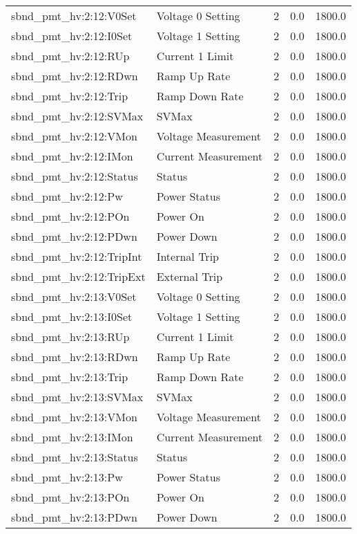 \begin{center}
\begin{longtable}{l | l l l l }
sbnd\_pmt\_hv:2:12:V0Set & Voltage 0 Setting & 2 & 0.0 & 1800.0\\ 
sbnd\_pmt\_hv:2:12:I0Set & Voltage 1 Setting & 2 & 0.0 & 1800.0\\ 
sbnd\_pmt\_hv:2:12:RUp & Current 1 Limit & 2 & 0.0 & 1800.0\\ 
sbnd\_pmt\_hv:2:12:RDwn & Ramp Up Rate & 2 & 0.0 & 1800.0\\ 
sbnd\_pmt\_hv:2:12:Trip & Ramp Down Rate & 2 & 0.0 & 1800.0\\ 
sbnd\_pmt\_hv:2:12:SVMax & SVMax & 2 & 0.0 & 1800.0\\ 
sbnd\_pmt\_hv:2:12:VMon & Voltage Measurement & 2 & 0.0 & 1800.0\\ 
sbnd\_pmt\_hv:2:12:IMon & Current Measurement & 2 & 0.0 & 1800.0\\ 
sbnd\_pmt\_hv:2:12:Status & Status & 2 & 0.0 & 1800.0\\ 
sbnd\_pmt\_hv:2:12:Pw & Power Status & 2 & 0.0 & 1800.0\\ 
sbnd\_pmt\_hv:2:12:POn & Power On & 2 & 0.0 & 1800.0\\ 
sbnd\_pmt\_hv:2:12:PDwn & Power Down & 2 & 0.0 & 1800.0\\ 
sbnd\_pmt\_hv:2:12:TripInt & Internal Trip & 2 & 0.0 & 1800.0\\ 
sbnd\_pmt\_hv:2:12:TripExt & External Trip & 2 & 0.0 & 1800.0\\ 
sbnd\_pmt\_hv:2:13:V0Set & Voltage 0 Setting & 2 & 0.0 & 1800.0\\ 
sbnd\_pmt\_hv:2:13:I0Set & Voltage 1 Setting & 2 & 0.0 & 1800.0\\ 
sbnd\_pmt\_hv:2:13:RUp & Current 1 Limit & 2 & 0.0 & 1800.0\\ 
sbnd\_pmt\_hv:2:13:RDwn & Ramp Up Rate & 2 & 0.0 & 1800.0\\ 
sbnd\_pmt\_hv:2:13:Trip & Ramp Down Rate & 2 & 0.0 & 1800.0\\ 
sbnd\_pmt\_hv:2:13:SVMax & SVMax & 2 & 0.0 & 1800.0\\ 
sbnd\_pmt\_hv:2:13:VMon & Voltage Measurement & 2 & 0.0 & 1800.0\\ 
sbnd\_pmt\_hv:2:13:IMon & Current Measurement & 2 & 0.0 & 1800.0\\ 
sbnd\_pmt\_hv:2:13:Status & Status & 2 & 0.0 & 1800.0\\ 
sbnd\_pmt\_hv:2:13:Pw & Power Status & 2 & 0.0 & 1800.0\\ 
sbnd\_pmt\_hv:2:13:POn & Power On & 2 & 0.0 & 1800.0\\ 
sbnd\_pmt\_hv:2:13:PDwn & Power Down & 2 & 0.0 & 1800.0\\ 

\end{longtable}
\end{center}
